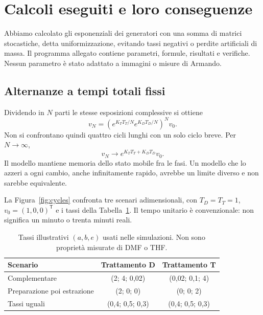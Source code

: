 \documentclass[11pt,reqno]{amsart}
\numberwithin{equation}{section}
\begin{document}
\section{Calcoli eseguiti e loro conseguenze}
\label{sec:sim}

Abbiamo calcolato gli esponenziali dei generatori con una somma
di matrici stocastiche, detta uniformizzazione, evitando tassi
negativi o perdite artificiali di massa. Il programma allegato
contiene parametri, formule, risultati e verifiche. Nessun
parametro \`e stato adattato a immagini o misure di Armando.

\subsection{Alternanze a tempi totali fissi}
Dividendo in $N$ parti le stesse esposizioni complessive si ottiene
\begin{equation}\label{eq:cycles}
 v_N=\left(e^{K_TT_T/N}e^{K_DT_D/N}\right)^Nv_0.
\end{equation}
Non si confrontano quindi quattro cicli lunghi con un solo ciclo
breve. Per $N\to\infty$,
\begin{equation}\label{eq:trotter}
 v_N\longrightarrow e^{K_TT_T+K_DT_D}v_0.
\end{equation}
Il modello mantiene memoria dello stato mobile fra le fasi.
Un modello che lo azzeri a ogni cambio, anche infinitamente rapido,
avrebbe un limite diverso e non sarebbe equivalente.

La Figura~\ref{fig:cycles} confronta tre scenari adimensionali,
con $T_D=T_T=1$, $v_0=(1,0,0)^{\mathsf T}$ e i tassi della
Tabella~\ref{tab:rates}. Il tempo unitario \`e convenzionale:
non significa un minuto o trenta minuti reali.

\begin{table}[htbp]
\caption{Tassi illustrativi $(a,b,e)$ usati nelle simulazioni.
Non sono propriet\`a misurate di DMF o THF.}
\label{tab:rates}\centering\small
\begin{tabular}{@{}lcc@{}}\toprule
Scenario & Trattamento D & Trattamento T\\\midrule
Complementare &(2; 4; 0{,}02)&(0{,}02; 0{,}1; 4)\\
Preparazione poi estrazione &(2; 0; 0)&(0; 0; 2)\\
Tassi uguali &(0{,}4; 0{,}5; 0{,}3)&(0{,}4; 0{,}5; 0{,}3)\\\bottomrule
\end{tabular}
\end{table}
\end{document}
